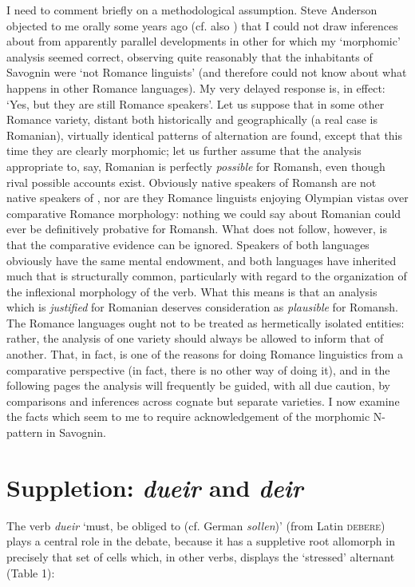 \documentclass[output=paper,
modfonts
]{LSP/langsci}
\begin{document}
I need to comment briefly on a methodological assumption. Steve Anderson
objected to me orally some years ago (cf. also \citealt[13f.;17]{anderson2011a})
that I could not draw inferences about  from apparently parallel
developments in other  for which my `morphomic'
analysis seemed correct, observing quite reasonably that the inhabitants
of Savognin were `not Romance linguists' (and therefore could not know
about what happens in other Romance languages). My very delayed response
is, in effect: `Yes, but they are still Romance speakers'. Let us
suppose that in some other Romance variety, distant both historically
and geographically (a real case is Romanian), virtually identical
patterns of alternation are found, except that this time they are
clearly morphomic; let us further assume that the analysis appropriate
to, say, Romanian is perfectly \emph{possible} for Romansh, even though
rival possible accounts exist. Obviously native speakers of Romansh are
not native speakers of , nor are they Romance linguists enjoying
Olympian vistas over comparative Romance morphology: nothing we could
say about Romanian could ever be definitively probative for Romansh.
What does not follow, however, is that the comparative evidence can be
ignored. Speakers of both languages obviously have the same mental
endowment, and both languages have inherited much that is structurally
common, particularly with regard to the organization of the inflexional
morphology of the verb. What this means is that an analysis which is
\emph{justified} for Romanian deserves consideration as \emph{plausible}
for Romansh. The Romance languages ought not to be treated as
hermetically isolated entities: rather, the analysis of one variety
should always be allowed to inform that of another. That, in fact, is
one of the reasons for doing Romance linguistics from a comparative
perspective (in fact, there is no other way of doing it), and in the
following pages the analysis will frequently be guided, with all due
caution, by comparisons and inferences across cognate but separate
varieties. I now examine the facts which seem to me to require
acknowledgement of the morphomic N-pattern in Savognin.

\section{Suppletion: \emph{dueir} and
\emph{deir}}

The verb \emph{dueir} `must, be obliged to (cf. German \emph{sollen})'
(from Latin \textsc{debere}) plays a central role in the debate, because
it has a suppletive root allomorph in precisely that set of cells which,
in other verbs, displays the `stressed' alternant (Table 1):
\end{document}

